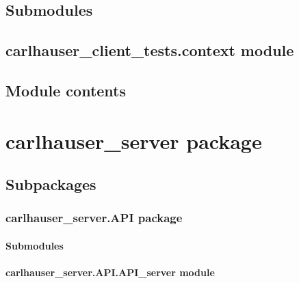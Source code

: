 \documentclass[letterpaper,10pt,english]{sphinxmanual}
\begin{document}
\section{Submodules}
\label{\detokenize{carlhauser_client_tests:submodules}}

\section{carlhauser\_client\_tests.context module}
\label{\detokenize{carlhauser_client_tests:module-carlhauser_client_tests.context}}\label{\detokenize{carlhauser_client_tests:carlhauser-client-tests-context-module}}

\section{Module contents}
\label{\detokenize{carlhauser_client_tests:module-carlhauser_client_tests}}\label{\detokenize{carlhauser_client_tests:module-contents}}

\chapter{carlhauser\_server package}
\label{\detokenize{carlhauser_server:carlhauser-server-package}}\label{\detokenize{carlhauser_server::doc}}

\section{Subpackages}
\label{\detokenize{carlhauser_server:subpackages}}

\subsection{carlhauser\_server.API package}
\label{\detokenize{carlhauser_server.API:carlhauser-server-api-package}}\label{\detokenize{carlhauser_server.API::doc}}

\subsubsection{Submodules}
\label{\detokenize{carlhauser_server.API:submodules}}

\subsubsection{carlhauser\_server.API.API\_server module}
\label{\detokenize{carlhauser_server.API:carlhauser-server-api-api-server-module}}
\end{document}
